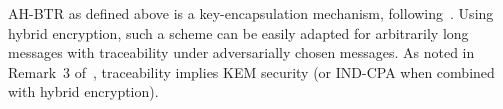 \noindent
AH-BTR as defined above is a key-encapsulation mechanism, following~\cite{C:Zhandry20}.
Using hybrid encryption,
such a scheme can be easily adapted for arbitrarily long messages
with traceability under adversarially chosen messages.
As noted in Remark~3 of~\cite{EPRINT:Zhandry20a},
traceability implies KEM security
(or IND-CPA when combined with hybrid encryption).


